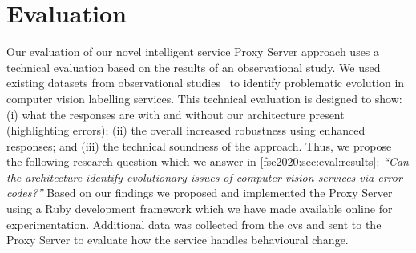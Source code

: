 







\section{Evaluation}
\label{fse2020:sec:eval}

Our evaluation of our novel intelligent service Proxy Server approach uses a technical evaluation based on the results of an observational study. We used existing datasets from observational studies~\citep{Cummaudo:2019icsme,Lin:2014vma} to identify problematic evolution in computer vision labelling services. This technical evaluation is designed to show: (i) what the responses are with and without our architecture present (highlighting errors); (ii) the overall increased robustness using enhanced responses; and (iii) the technical soundness of the approach. Thus, we propose the following research question which we answer in \cref{fse2020:sec:eval:results}: \textit{``Can the architecture identify evolutionary issues of computer vision services via error codes?''} Based on our findings we proposed and implemented the Proxy Server using a Ruby development framework which we have made available online for experimentation. Additional data was collected from the \gls{cvs} and sent to the Proxy Server to evaluate how the service handles behavioural change. 

